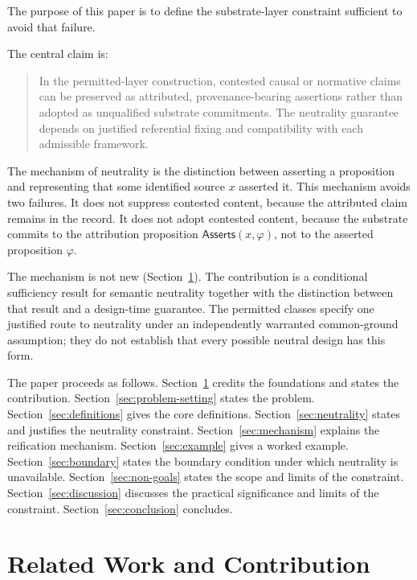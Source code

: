 \documentclass[11pt]{article}
\theoremstyle{plain}
\theoremstyle{definition}
\theoremstyle{remark}
\newcommand{\SecRef}[1]{Section~\ref{#1}}
\newcommand{\Asserts}{\mathsf{Asserts}}
\begin{document}
The purpose of this paper is to define the substrate-layer constraint
sufficient to avoid that failure.

The central claim is:

\begin{quote}
  In the permitted-layer construction, contested causal or normative
  claims can be preserved as attributed, provenance-bearing assertions
  rather than adopted as unqualified substrate commitments.
  The neutrality guarantee depends on justified referential fixing
  and compatibility with each admissible framework.
\end{quote}

The mechanism of neutrality is the distinction between
asserting a proposition and representing that some identified source $x$
asserted it.
This mechanism avoids two failures.
It does not suppress contested content,
because the attributed claim remains in the record.
It does not adopt contested content,
because the substrate commits to the attribution proposition
$\Asserts(x,\varphi)$,
not to the asserted proposition $\varphi$.

The mechanism is not new (\SecRef{sec:related-work}).
The contribution is a conditional sufficiency result for semantic neutrality
together with the distinction between that result and a design-time guarantee.
The permitted classes specify one justified route to neutrality
under an independently warranted common-ground assumption;
they do not establish that every possible neutral design has this form.

The paper proceeds as follows.
\SecRef{sec:related-work} credits the foundations and states the contribution.
\SecRef{sec:problem-setting} states the problem.
\SecRef{sec:definitions} gives the core definitions.
\SecRef{sec:neutrality} states and justifies the neutrality constraint.
\SecRef{sec:mechanism} explains the reification mechanism.
\SecRef{sec:example} gives a worked example.
\SecRef{sec:boundary} states the boundary condition under which neutrality is unavailable.
\SecRef{sec:non-goals} states the scope and limits of the constraint.
\SecRef{sec:discussion} discusses the practical significance and limits of the constraint.
\SecRef{sec:conclusion} concludes.

\section{Related Work and Contribution}
\label{sec:related-work}
\end{document}
